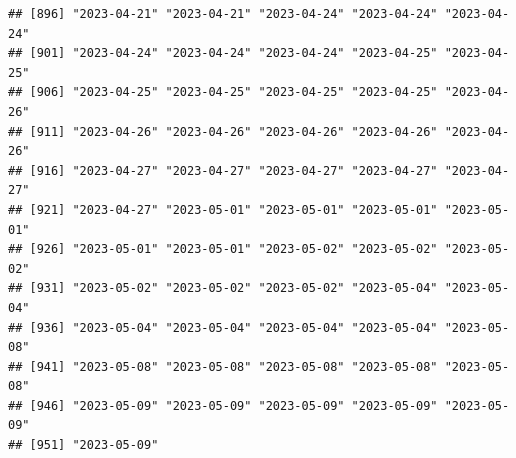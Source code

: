 \documentclass[
]{article}
\newenvironment{Shaded}{\begin{snugshade}}{\end{snugshade}}
\newcommand{\FunctionTok}[1]{\textcolor[rgb]{0.00,0.00,0.00}{#1}}
\newcommand{\NormalTok}[1]{#1}
\newcommand{\OtherTok}[1]{\textcolor[rgb]{0.56,0.35,0.01}{#1}}
\newcommand{\SpecialCharTok}[1]{\textcolor[rgb]{0.00,0.00,0.00}{#1}}
\begin{document}
\begin{verbatim}
## [896] "2023-04-21" "2023-04-21" "2023-04-24" "2023-04-24" "2023-04-24"
## [901] "2023-04-24" "2023-04-24" "2023-04-24" "2023-04-25" "2023-04-25"
## [906] "2023-04-25" "2023-04-25" "2023-04-25" "2023-04-25" "2023-04-26"
## [911] "2023-04-26" "2023-04-26" "2023-04-26" "2023-04-26" "2023-04-26"
## [916] "2023-04-27" "2023-04-27" "2023-04-27" "2023-04-27" "2023-04-27"
## [921] "2023-04-27" "2023-05-01" "2023-05-01" "2023-05-01" "2023-05-01"
## [926] "2023-05-01" "2023-05-01" "2023-05-02" "2023-05-02" "2023-05-02"
## [931] "2023-05-02" "2023-05-02" "2023-05-02" "2023-05-04" "2023-05-04"
## [936] "2023-05-04" "2023-05-04" "2023-05-04" "2023-05-04" "2023-05-08"
## [941] "2023-05-08" "2023-05-08" "2023-05-08" "2023-05-08" "2023-05-08"
## [946] "2023-05-09" "2023-05-09" "2023-05-09" "2023-05-09" "2023-05-09"
## [951] "2023-05-09"
\end{verbatim}

\begin{Shaded}
\end{Shaded}
\end{document}
